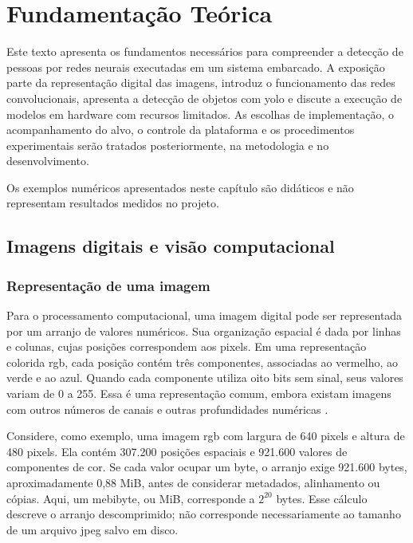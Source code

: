 \chapter{Fundamentação Teórica}
\label{cap:fundamentacao}

Este texto apresenta os fundamentos necessários para compreender a detecção de pessoas por redes neurais executadas em um sistema embarcado. A exposição parte da representação digital das imagens, introduz o funcionamento das redes convolucionais, apresenta a detecção de objetos com \gls{yolo} e discute a execução de modelos em hardware com recursos limitados. As escolhas de implementação, o acompanhamento do alvo, o controle da plataforma e os procedimentos experimentais serão tratados posteriormente, na metodologia e no desenvolvimento.

Os exemplos numéricos apresentados neste capítulo são didáticos e não representam resultados medidos no projeto.

\section{Imagens digitais e visão computacional}
\label{sec:imagens-digitais}

\subsection{Representação de uma imagem}
\label{subsec:representacao-imagem}

Para o processamento computacional, uma imagem digital pode ser representada por um arranjo de valores numéricos. Sua organização espacial é dada por linhas e colunas, cujas posições correspondem aos pixels. Em uma representação colorida \gls{rgb}, cada posição contém três componentes, associadas ao vermelho, ao verde e ao azul. Quando cada componente utiliza oito bits sem sinal, seus valores variam de 0 a 255. Essa é uma representação comum, embora existam imagens com outros números de canais e outras profundidades numéricas \cite{stanford-imagens}.

Considere, como exemplo, uma imagem \gls{rgb} com largura de 640 pixels e altura de 480 pixels. Ela contém 307.200 posições espaciais e 921.600 valores de componentes de cor. Se cada valor ocupar um byte, o arranjo exige 921.600 bytes, aproximadamente 0,88 MiB, antes de considerar metadados, alinhamento ou cópias. Aqui, um mebibyte, ou MiB, corresponde a \(2^{20}\) bytes. Esse cálculo descreve o arranjo descomprimido; não corresponde necessariamente ao tamanho de um arquivo \gls{jpeg} salvo em disco.

